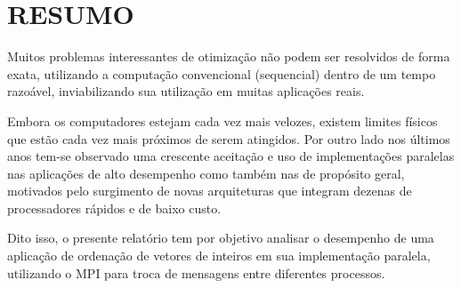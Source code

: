 \section{\normalsize RESUMO}
	Muitos problemas interessantes de otimização não podem ser resolvidos de forma exata, utilizando a computação convencional (sequencial) dentro de um tempo razoável, inviabilizando sua utilização em muitas aplicações reais. 
	
	Embora os computadores estejam cada vez mais velozes, existem limites físicos que estão cada vez mais próximos de serem atingidos. Por outro lado nos últimos anos tem-se observado uma crescente aceitação e uso de implementações paralelas nas aplicações de alto desempenho como também nas de propósito geral, motivados pelo surgimento de novas arquiteturas que integram dezenas de processadores rápidos e de baixo custo. 
	
	Dito isso, o presente relatório tem por objetivo analisar o desempenho de uma aplicação de ordenação de vetores de inteiros em sua implementação paralela, utilizando o MPI para troca de mensagens entre diferentes processos.